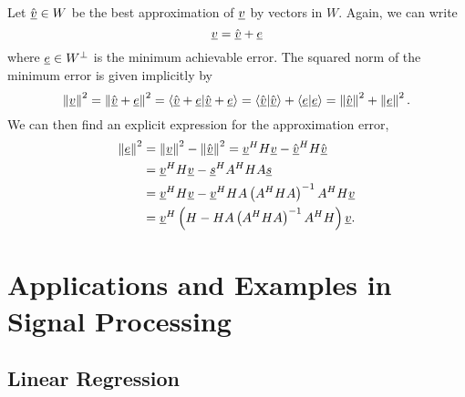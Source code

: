 Let $\hat{\underline{v}} \in W$ be the best approximation of $\underline{v}$ by vectors in $W$.
Again, we can write
\begin{equation*}
\underline{v} = \hat{\underline{v}} + \underline{e}
\end{equation*}
where $\underline{e} \in W^{\bot}$ is the minimum achievable error.
The squared norm of the minimum error is given implicitly by
\begin{equation*}
\left\| \underline{v} \right\|^2
= \left\| \hat{\underline{v}} + \underline{e} \right\|^2
= \left\langle \hat{\underline{v}} + \underline{e} | \hat{\underline{v}} + \underline{e} \right\rangle
= \left\langle \hat{\underline{v}} | \hat{\underline{v}} \right\rangle
+ \left\langle \underline{e} | \underline{e} \right\rangle
= \left\| \hat{\underline{v}} \right\|^2 + \left\| \underline{e} \right\|^2 .
\end{equation*}
We can then find an explicit expression for the approximation error,
\begin{equation*}
\begin{split}
\left\| \underline{e} \right\|^2
&= \left\| \underline{v} \right\|^2
- \left\| \hat{\underline{v}} \right\|^2
= \underline{v}^H H \underline{v} - \hat{\underline{v}}^H H \hat{\underline{v}} \\
&= \underline{v}^H H \underline{v} - \underline{s}^H A^H H A \underline{s} \\
&= \underline{v}^H H \underline{v}
- \underline{v}^H H A \left( A^H H A \right)^{-1} A^H H \underline{v} \\
&= \underline{v}^H
\left( H -  H A \left( A^H H A \right)^{-1} A^H H \right)
\underline{v}.
\end{split}
\end{equation*}


\section{Applications and Examples in Signal Processing}

\subsection{Linear Regression}

